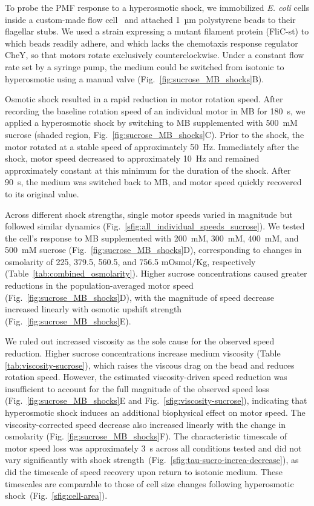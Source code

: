 \documentclass[twocolumn]{biophys-new}%
\begin{document}
To probe the PMF response to a hyperosmotic shock, we immobilized \textit{E. coli} cells inside a custom-made flow cell~\cite{beg_block} and attached 1~µm polystyrene beads to their flagellar stubs. We used a strain expressing a mutant filament protein (FliC-st) to which beads readily adhere, and which lacks the chemotaxis response regulator CheY, so that motors rotate exclusively counterclockwise. Under a constant flow rate set by a syringe pump, the medium could be switched from isotonic to hyperosmotic using a manual valve (Fig.~\ref{fig:sucrose_MB_shocks}B).

Osmotic shock resulted in a rapid reduction in motor rotation speed. After recording the baseline rotation speed of an individual motor in MB for 180~s, we applied a hyperosmotic shock by switching to MB supplemented with 500~mM sucrose (shaded region, Fig.~\ref{fig:sucrose_MB_shocks}C). Prior to the shock, the motor rotated at a stable speed of approximately 50~Hz. Immediately after the shock, motor speed decreased to approximately 10~Hz and remained approximately constant at this minimum for the duration of the shock. After 90~s, the medium was switched back to MB, and motor speed quickly recovered to its original value.

Across different shock strengths, single  motor speeds varied in magnitude but followed similar dynamics (Fig.~\ref{sfig:all_individual_speeds_sucrose}). We tested the cell’s response to MB supplemented with 200~mM, 300~mM, 400~mM, and 500~mM sucrose (Fig.~\ref{fig:sucrose_MB_shocks}D), corresponding to changes in osmolarity of 225, 379.5, 560.5, and 756.5 mOsmol/Kg, respectively (Table~\ref{tab:combined_osmolarity}). Higher sucrose concentrations caused greater reductions in the population-averaged motor speed (Fig.~\ref{fig:sucrose_MB_shocks}D), with the magnitude of speed decrease increased linearly with osmotic upshift strength (Fig.~\ref{fig:sucrose_MB_shocks}E). 

We ruled out increased viscosity as the sole cause for the observed speed reduction. Higher sucrose concentrations increase medium viscosity (Table \ref{tab:viscosity-sucrose}), which raises the viscous drag on the bead and reduces rotation speed. However, the estimated viscosity-driven speed reduction was insufficient to account for the full magnitude of the observed speed loss (Fig.~\ref{fig:sucrose_MB_shocks}E and Fig.~\ref{sfig:viscosity-sucrose}), indicating that hyperosmotic shock induces an additional biophysical effect on motor speed. The viscosity-corrected speed decrease also increased linearly with the change in osmolarity (Fig. \ref{fig:sucrose_MB_shocks}F). The characteristic timescale of motor speed loss was approximately 3~s across all conditions tested and did not vary significantly with shock strength~(Fig.~\ref{sfig:tau-sucro-increa-decrease}), as did the timescale of speed recovery upon return to isotonic medium. These timescales are comparable to those of cell size changes following hyperosmotic shock~(Fig.~\ref{sfig:cell-area}).
\end{document}
